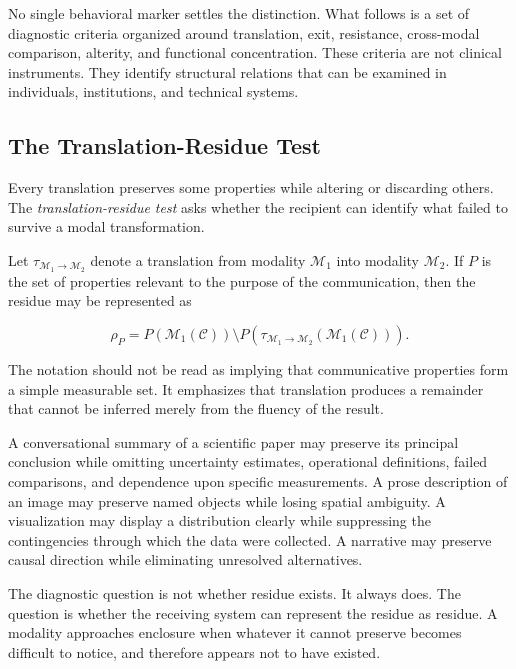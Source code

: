 \documentclass[11pt]{article}
\newcommand{\term}[1]{\emph{#1}}
\newcommand{\modality}{\mathcal{M}}
\newcommand{\contentobj}{\mathcal{C}}
\begin{document}
No single behavioral marker settles the distinction. What follows is a set of
diagnostic criteria organized around translation, exit, resistance,
cross-modal comparison, alterity, and functional concentration. These criteria
are not clinical instruments. They identify structural relations that can be
examined in individuals, institutions, and technical systems.

\subsection{The Translation-Residue Test}

Every translation preserves some properties while altering or discarding
others. The \term{translation-residue test} asks whether the recipient can
identify what failed to survive a modal transformation.

Let \(\tau_{\modality_1\rightarrow\modality_2}\) denote a translation from
modality \(\modality_1\) into modality \(\modality_2\). If \(P\) is the set of
properties relevant to the purpose of the communication, then the residue may
be represented as

\begin{equation}
  \rho_P
  =
  P\!\left(\modality_1(\contentobj)\right)
  \setminus
  P\!\left(
    \tau_{\modality_1\rightarrow\modality_2}
    (\modality_1(\contentobj))
  \right).
  \label{eq:translation-residue}
\end{equation}

The notation should not be read as implying that communicative properties form
a simple measurable set. It emphasizes that translation produces a remainder
that cannot be inferred merely from the fluency of the result.

A conversational summary of a scientific paper may preserve its principal
conclusion while omitting uncertainty estimates, operational definitions,
failed comparisons, and dependence upon specific measurements. A prose
description of an image may preserve named objects while losing spatial
ambiguity. A visualization may display a distribution clearly while
suppressing the contingencies through which the data were collected. A
narrative may preserve causal direction while eliminating unresolved
alternatives.

The diagnostic question is not whether residue exists. It always does. The
question is whether the receiving system can represent the residue as residue.
A modality approaches enclosure when whatever it cannot preserve becomes
difficult to notice, and therefore appears not to have existed.
\end{document}
